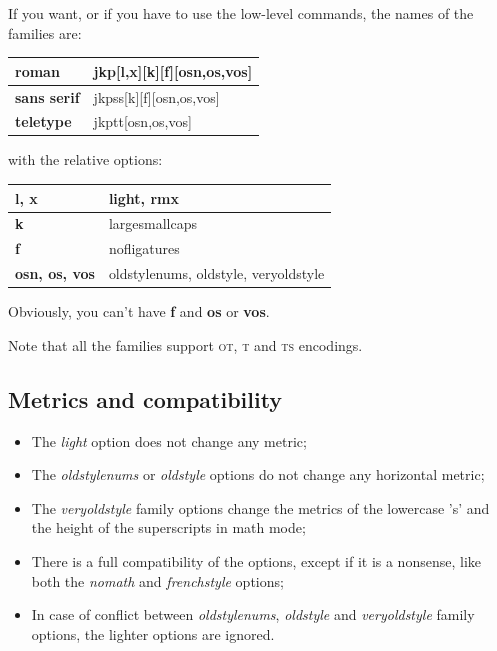 \documentclass[a4paper,11pt]{article}
\begin{document}
If you want, or if you have to use the low-level commands, the names of the families are:

\begin{center}\begin{tabular}{|l|l|}\hline
\textbf{roman}& jkp[l,x][k][f][osn,os,vos]\\\hline
\textbf{sans serif}& jkpss[k][f][osn,os,vos]\\\hline
\textbf{teletype}& jkptt[osn,os,vos]\\\hline
\end{tabular}\end{center}

with the relative options:

\begin{center}\begin{tabular}{|l|l|}\hline
\textbf{l, x}& light, rmx\\\hline
\textbf{k}& largesmallcaps\\\hline
\textbf{f}&nofligatures\\\hline
\textbf{osn, os, vos}& oldstylenums, oldstyle, veryoldstyle\\\hline
\end{tabular}\end{center}

Obviously, you can't have \textbf{f} and \textbf{os} or \textbf{vos}.

Note that all the families support \textsc{ot}, \textsc{t} and \textsc{ts} encodings.


\subsection{Metrics and compatibility}

\begin{itemize}
	\item The \textit{light} option does not change any metric;
	\item The \textit{oldstylenums} or \textit{oldstyle} options do not change any horizontal metric;
	\item The \textit{veryoldstyle} family options change the metrics of the lowercase 's'
				and the height of the superscripts in math mode;
	\item There is a full compatibility of the options, except if it is a nonsense,
				like both the \textit{nomath} and \textit{frenchstyle} options;
	\item In case of conflict between \textit{oldstylenums}, \textit{oldstyle} and \textit{veryoldstyle} family options,
				the lighter options are ignored.
\end{itemize}
\end{document}
